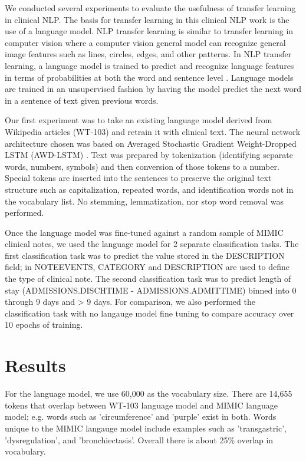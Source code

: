 \documentclass{amia}
\begin{document}
We conducted several experiments to evaluate the usefulness of transfer learning in clinical NLP. The basis for transfer learning in this clinical NLP work is the use of a language model. NLP transfer learning is similar to transfer learning in computer vision where a computer vision general model can recognize general image features such as lines, circles, edges, and other patterns. In NLP transfer learning, a language model is trained to predict and recognize language features in terms of probabilities at both the word and sentence level \cite{Bengio:2003:NPL:944919.944966}. Language models are trained in an unsupervised fashion by having the model predict the next word in a sentence of text given previous words.

Our first experiment was to take an existing language model derived from Wikipedia articles (WT-103) \cite{Merity2016Sep} and retrain it with clinical text. The neural network architecture chosen was based on Averaged Stochastic Gradient Weight-Dropped LSTM (AWD-LSTM) \cite{Merity2017Aug}. Text was prepared by tokenization (identifying separate words, numbers, symbols) and then conversion of those tokens to a number. Special tokens are inserted into the sentences to preserve the original text structure such as capitalization, repeated words, and identification words not in the vocabulary list. No stemming, lemmatization, nor stop word removal was performed.

Once the language model was fine-tuned against a random sample of MIMIC clinical notes, we used the language model for 2 separate classification tasks. The first classification task was to predict the value stored in the DESCRIPTION field; in NOTEEVENTS, CATEGORY and DESCRIPTION are used to define the type of clinical note. The second classification task was to predict length of stay (ADMISSIONS.DISCHTIME - ADMISSIONS.ADMITTIME) binned into 0 through 9 days and > 9 days. For comparison, we also performed the classification task with no langauge model fine tuning to compare accuracy over 10 epochs of training.

\section*{Results}

For the language model, we use 60,000 as the vocabulary size. There are 14,655 tokens that overlap between WT-103 language model and MIMIC language model; e.g. words such as 'circumference' and 'purple' exist in both. Words unique to the MIMIC langauge model include examples such as 'transgastric', 'dysregulation', and 'bronchiectasis'. Overall there is about 25\% overlap in vocabulary.
\end{document}
